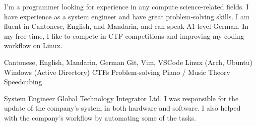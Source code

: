 \documentclass[a4paper]{ReadableCV}
\begin{document}
	






\showHeader



I'm a programmer looking for experience in any compute science-related fields. I have experience as a system engineer and have great problem-solving skills. I am fluent in Cantonese, English, and Mandarin, and can speak A1-level German. In my free-time, I like to compete in CTF competitions and improving my coding workflow on Linux. 


		  {Cantonese, English, Mandarin, German}
		  {Git, Vim, VSCode}
		  {Linux (Arch, Ubuntu)}
		  {Windows (Active Directory)}
		  {CTFs}
		  {Problem-solving}
		  {Piano / Music Theory}
		  {Speedcubing}
		  


{}
        {System Engineer}
        {Global Technology Integrator Ltd.}
				{I was responsible for the update of the company's system in both hardware and software. I also helped with the company's workflow by automating some of the tasks.}

         
          
\end{document}
